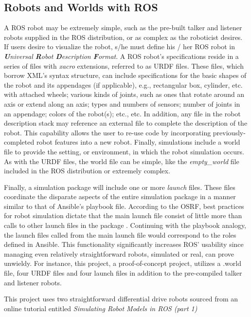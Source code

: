 \documentclass[9pt,twocolumn,twoside]{../../styles/osajnl}
\begin{document}
\subsection{Robots and Worlds with ROS}
A ROS robot may be extremely simple, such as the pre-built talker and listener robots supplied in the ROS distribution, or as complex as the roboticist desires.  If users desire to visualize the robot, s/he must define his / her ROS robot in \textit{\textbf{U}niversal \textbf{R}obot \textbf{D}escription \textbf{F}ormat}.  A ROS robot's specifications reside in a series of files with \textit{xacro} extensions, referred to as URDF files.  These files, which borrow XML's syntax structure, can include specifications for the basic shapes of the robot and its appendages (if applicable), e.g., rectangular box, cylinder, etc. with attached wheels; various kinds of joints, such as ones that rotate around an axis or extend along an axis; types and numbers of sensors; number of joints in an appendage; colors of the robot(s); etc., etc.  In addition, any file in the robot description stack may reference an external file to complete the description of the robot.  This capability allows the user to re-use code by incorporating previously-completed robot features into a new robot.  Finally, simulations include a world file to provide the setting, or environment, in which the robot simulation occurs.  As with the URDF files, the world file can be simple, like the \textit{empty\_world} file included in the ROS distribution or extremely complex.  

Finally, a simulation package will include one or more \textit{launch} files.  These files coordinate the disparate aspects of the entire simulation package in a manner similar to that of Ansible's playbook file.  According to the OSRF, best practices for robot simulation dictate that the main launch file consist of little more than calls to other launch files in the package \cite{www-ros-launch}.  Continuing with the playbook analogy, the launch files called from the main launch file would correspond to the roles defined in Ansible.  This functionality significantly increases ROS' usability since managing even relatively straightforward robots, simulated or real, can prove unwieldy. For instance, this project, a proof-of-concept project, utilizes a .world file, four URDF files and four launch files in addition to the pre-compiled talker and listener robots.  

This project uses two straightforward differential drive robots sourced from an online tutorial entitled \textit{Simulating Robot Models in ROS (part 1)} \cite{www-mybot-moore}
\end{document}
